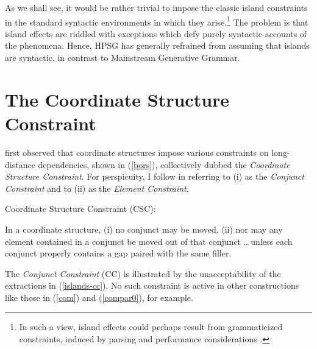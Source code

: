 \documentclass[output=paper,biblatex,babelshorthands,newtxmath,draftmode,colorlinks,citecolor=brown]{langscibook}
\begin{document}
\noindent
As we shall see, it would be rather trivial to impose the classic island constraints in the standard syntactic
environments in which they arise.\footnote{In such a view, island effects could perhaps result from
grammaticized constraints, induced by parsing and performance considerations  
\citep{prichett,fodor78,Fodor83}.}
 The problem is that island effects are riddled with exceptions which
defy purely syntactic accounts of the phenomena.  Hence, HPSG has generally refrained from
assuming that islands are syntactic, in contrast to Mainstream Generative Grammar.


\section{The Coordinate Structure Constraint}

\citet{Ross67} first observed that coordinate structures impose various constraints on long-distance
dependencies, shown in (\ref{bors}), collectively dubbed the \emph{Coordinate Structure
  Constraint}. For perspicuity, I follow \citet{grosu73} in referring to (i) as the \emph{Conjunct
  Constraint} and to (ii) as the \emph{Element Constraint}.

\eanoraggedright \label{bors}
Coordinate Structure Constraint (CSC):

In a coordinate structure, (i) no conjunct may be moved, (ii) nor may any element contained in a
conjunct be moved out of that conjunct \ldots \,unless each conjunct properly contains a gap paired
with the same filler.  \z

\largerpage
\noindent
The \emph{Conjunct Constraint} (CC) is illustrated by the unacceptability of the extractions in
(\ref{islands-cc}). No such constraint is active in other constructions like those in (\ref{com})
and (\ref{compar0}), for example.
 

\eal
\label{islands-cc}  
\zl 

\eal
\label{com}
\zl
\end{document}
